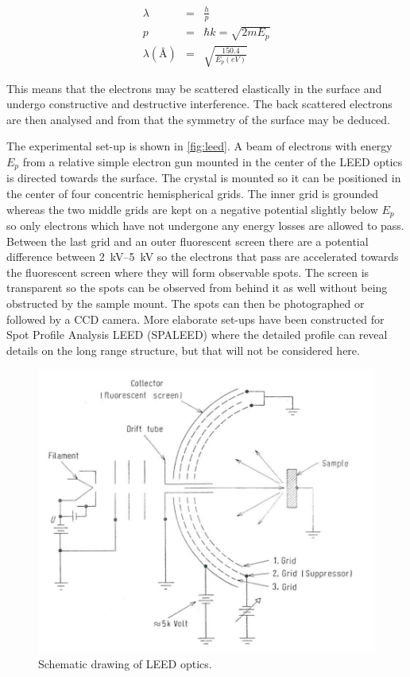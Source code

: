 \begin{eqnarray}
\lambda	& =	& \frac{h}{p}\\
p	& =	& \hbar k=\sqrt{2mE_p}\\
\lambda(\si{\angstrom})	& =	& \sqrt{\frac{150.4}{E_p(\si{eV})}}
\end{eqnarray}

This means that the electrons may be scattered elastically  in the surface and undergo constructive and destructive interference. The back scattered electrons are then analysed and from that the symmetry of the surface may be deduced.

The experimental set-up is shown in \autoref{fig:leed}.  A beam of electrons with energy $E_p$ from a relative simple electron gun mounted in the center of the LEED optics is directed towards the surface. The crystal is mounted so it can be positioned in the center of four concentric hemispherical grids. The inner grid is grounded whereas the two middle grids are kept on a negative potential slightly below $E_p$ so only electrons which have not undergone any energy losses are allowed to pass. Between the last grid and an outer fluorescent screen there are a potential difference between \SIrange{2}{5}{kV} so the electrons that pass are accelerated towards the fluorescent screen where they will form observable spots. The screen is  transparent so the spots can be observed from behind it as well without being obstructed by the sample mount. The spots can then be photographed or followed by a CCD camera. More elaborate set-ups have been constructed for Spot Profile Analysis LEED (SPALEED) where the detailed profile can reveal details on the long range structure, but that will not be considered here.

\begin{figure}[h!]
	\begin{center}
	\includegraphics[scale=4]{figures/09_05.png}
	\caption{Schematic drawing of LEED optics.}
	\label{fig:leed}
	\end{center}
\end{figure}


